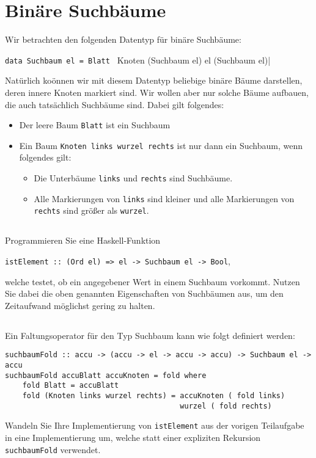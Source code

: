 \documentclass[
  10pt,                   %
  DIV12,
  german,                 %
  oneside,                %
  parskip=half,           %
  headings=normal,        %
  captions=tableheading,  %
]{scrartcl}
\begin{document}
\section{Binäre Suchbäume}
Wir betrachten den folgenden Datentyp für binäre Suchbäume:
\begin{center}
\lstinline|data Suchbaum el = Blatt | Knoten (Suchbaum el) el (Suchbaum el)|
\end{center}
Natürlich koönnen wir mit diesem Datentyp beliebige binäre Bäume darstellen, deren innere Knoten markiert sind. Wir wollen aber nur solche Bäume aufbauen, die auch tatsächlich Suchbäume sind. Dabei gilt folgendes:
\begin{itemize}
\item Der leere Baum \lstinline|Blatt| ist ein Suchbaum 
\item Ein Baum \lstinline|Knoten links wurzel rechts| ist nur dann ein Suchbaum, wenn folgendes gilt:
\begin{itemize}
\item Die Unterbäume \lstinline|links| und \lstinline|rechts| sind Suchbäume.
\item Alle Markierungen von \lstinline|links| sind kleiner und alle Markierungen von \lstinline|rechts| sind größer als \lstinline|wurzel|.
\end{itemize}
\end{itemize}
\subsection{}
Programmieren Sie eine Haskell-Funktion
\begin{center}
\lstinline|istElement :: (Ord el) => el -> Suchbaum el -> Bool|,
\end{center}
welche testet, ob ein angegebener Wert in einem Suchbaum vorkommt. Nutzen Sie dabei die oben genannten Eigenschaften von Suchbäumen aus, um den Zeitaufwand möglichst gering zu halten.

\subsection{}
Ein Faltungsoperator für den Typ Suchbaum kann wie folgt definiert werden: 
\begin{lstlisting}
suchbaumFold :: accu -> (accu -> el -> accu -> accu) -> Suchbaum el -> accu
suchbaumFold accuBlatt accuKnoten = fold where
    fold Blatt = accuBlatt
    fold (Knoten links wurzel rechts) = accuKnoten ( fold links)
                                        wurzel ( fold rechts)
\end{lstlisting}
Wandeln Sie Ihre Implementierung von \lstinline|istElement| aus der vorigen Teilaufgabe in eine Implementierung um, welche statt einer expliziten Rekursion \lstinline|suchbaumFold| verwendet.
\end{document}
